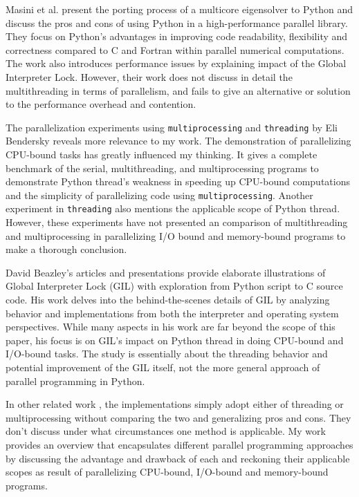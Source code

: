 \documentclass[letterpaper,twocolumn,10pt]{article}
\begin{document}
Masini et al. \cite{masini} present the porting process of a multicore eigensolver to Python and discuss the pros and cons of using Python in a high-performance parallel library. They focus on Python's advantages in improving code readability, flexibility and correctness compared to C and Fortran within parallel numerical computations. The work also introduces performance issues by explaining impact of the Global Interpreter Lock. However, their work does not discuss in detail the multithreading in terms of parallelism, and fails to give an alternative or solution to the performance overhead and contention.

The parallelization experiments using \verb#multiprocessing# and \verb#threading# by Eli Bendersky \cite{bendersky} reveals more relevance to my work. The demonstration of parallelizing CPU-bound tasks has greatly influenced my thinking. It gives a complete benchmark of the serial, multithreading, and multiprocessing programs to demonstrate Python thread's weakness in speeding up CPU-bound computations and the simplicity of parallelizing code using \verb#multiprocessing#. Another experiment in \verb#threading# also mentions the applicable scope of Python thread. However, these experiments have not presented an comparison of multithreading and multiprocessing in parallelizing I/O bound and memory-bound programs to make a thorough conclusion.

David Beazley's \cite{dabeaz1}\cite{dabeaz2} articles and presentations provide elaborate illustrations of Global Interpreter Lock (GIL) with exploration from Python script to C source code. His work delves into the behind-the-scenes details of GIL by analyzing behavior and implementations from both the interpreter and operating system perspectives. While many aspects in his work are far beyond the scope of this paper, his focus is on GIL's impact on Python thread in doing CPU-bound and I/O-bound tasks. The study is essentially about the threading behavior and potential improvement of the GIL itself, not the more general approach of parallel programming in Python. 

In other related work \cite{rudd}\cite{molden}, the implementations simply adopt either of threading or multiprocessing without comparing the two and generalizing pros and cons. They don't discuss under what circumstances one method is applicable. My work provides an overview that encapsulates different parallel programming approaches by discussing the advantage and drawback of each and reckoning their applicable scopes as result of parallelizing CPU-bound, I/O-bound and memory-bound programs.
\end{document}
